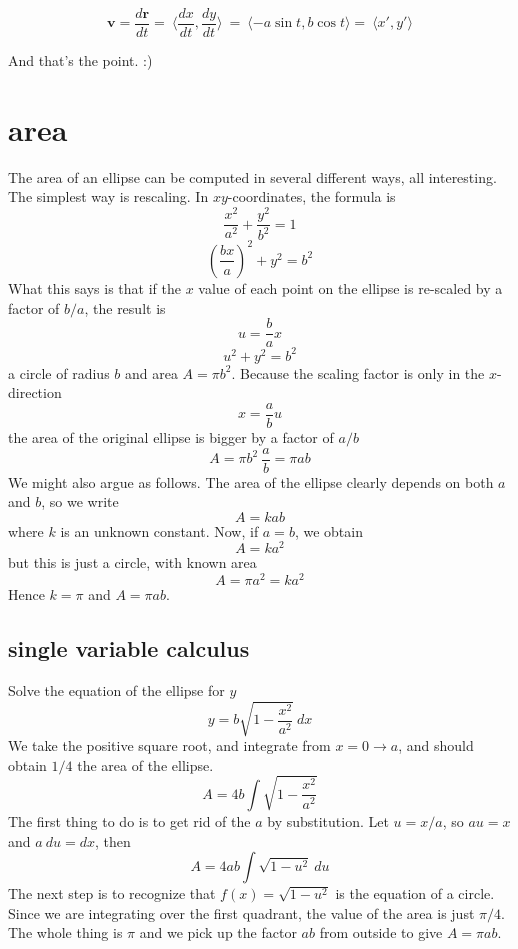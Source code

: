 \documentclass[11pt, oneside]{report}   	%
\begin{document}
\[ \mathbf{v} = \frac{d\mathbf{r}}{dt} = \ \langle \frac{dx}{dt}, \frac{dy}{dt} \rangle \ = \ \langle -a \sin t,b \cos t \rangle = \ \langle x',y' \rangle \]

And that's the point.   :)

\section*{area}
The area of an ellipse can be computed in several different ways, all interesting.  The simplest way is rescaling.  In $xy$-coordinates, the formula is
\[ \frac{x^2}{a^2} + \frac{y^2}{b^2} = 1 \]
\[ (\frac{bx}{a})^2 + y^2 = b^2 \]
What this says is that if the $x$ value of each point on the ellipse is re-scaled by a factor of $b/a$, the result is
\[ u = \frac{b}{a}x \]
\[ u^2 + y^2 = b^2 \]
a circle of radius $b$ and area $A = \pi b^2$.  Because the scaling factor is only in the $x$-direction
\[ x = \frac{a}{b}u \]
the area of the original ellipse is bigger by a factor of $a/b$
\[ A = \pi b^2 \ \frac{a}{b} = \pi ab \]
We might also argue as follows.  The area of the ellipse clearly depends on both $a$ and $b$, so we write
\[ A = k a b \]
where $k$ is an unknown constant.  Now, if $a=b$, we obtain
\[ A = k a^2 \]
but this is just a circle, with known area
\[ A = \pi a^2 = k a^2 \]
Hence $k = \pi$ and $A = \pi ab$.

\subsection*{single variable calculus}
Solve the equation of the ellipse for $y$
\[ y = b \sqrt{1 - \frac{x^2}{a^2} } \ dx  \]
We take the positive square root, and integrate from $x = 0 \rightarrow a$, and should obtain $1/4$ the area of the ellipse.
\[ A = 4 b \int \sqrt{1 - \frac{x^2}{a^2} }  \]
The first thing to do is to get rid of the $a$ by substitution.  Let $u = x/a$, so $au = x$ and $a \ du = dx$, then
\[ A = 4 ab \int \sqrt{1 - u^2} \ du  \]
The next step is to recognize that $f(x) = \sqrt{1-u^2}$ is the equation of a circle.  Since we are integrating over the first quadrant, the value of the area is just $\pi/4$.  The whole thing is $\pi$ and we pick up the factor $ab$ from outside to give $A = \pi ab$.
\end{document}
